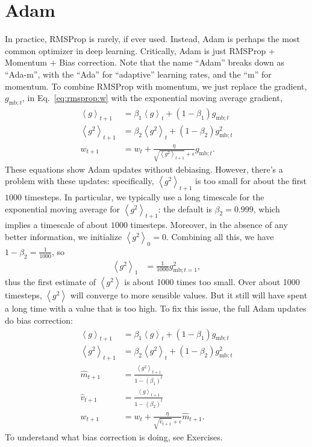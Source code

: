 \documentclass{article}
\newcommand{\bracket}[3]{\left#1 #3 \right#2}
\newcommand{\ab}{\bracket{\langle}{\rangle}}
\newcommand{\0}{\mathbf{0}}
\newcommand{\gsmbt}{g_{\text{mb}; t}}
\newcommand{\vh}{\hat{v}}
\newcommand{\mh}{\hat{m}}
\newcommand{\gssqb}{\ab{g^2}}
\newcommand{\gsb}{\ab{g}}
\begin{document}
\section{Adam}

In practice, RMSProp is rarely, if ever used.
Instead, Adam is perhaps the most common optimizer in deep learning.
Critically, Adam is just RMSProp + Momentum + Bias correction.
Note that the name ``Adam'' breaks down as ``Ada-m'', with the ``Ada'' for ``adaptive'' learning rates, and the ``m'' for momentum.
To combine RMSProp with momentum, we just replace the gradient, $\gsmbt$, in Eq.~\eqref{eq:rmsprop:w} with the exponential moving average gradient, 
\begin{align}
  \gsb_{t+1} &= \beta_1 \gsb_{t} + (1-\beta_1) \gsmbt\\
  \gssqb_{t+1} &= \beta_2 \gssqb_{t} + (1-\beta_2) \gsmbt^2\\
  w_{t+1} &= w_t + \frac{\eta}{\sqrt{\gssqb_{t+1}} + \epsilon}\gsmbt.
\end{align}
These equations show Adam updates without debiasing.
However, there's a problem with these updates: specifically, $\gssqb_{t+1}$ is too small for about the first $1000$ timesteps.
In particular, we typically use a long timescale for the exponential moving average for $\gssqb_{t+1}$: the default is $\beta_2 = 0.999$, which implies a timescale of about $1000$ timesteps.
Moreover, in the absence of any better information, we initialize $\gssqb_0 = 0$.
Combining all this, we have $1-\beta_2 = \tfrac{1}{1000}$, so
\begin{align}
  \gssqb_1 &= \tfrac{1}{1000} g_{\text{mb}; t=1}^2,
\end{align}
thus the first estimate of $\gssqb$ is about 1000 times too small.
Over about 1000 timesteps, $\gssqb$ will converge to more sensible values.
But it still will have spent a long time with a value that is too high.
To fix this issue, the full Adam updates do bias correction:
\begin{align}
  \gsb_{t+1} &= \beta_1 \gsb_{t} + (1-\beta_1) \gsmbt\\
  \gssqb_{t+1} &= \beta_2 \gssqb_{t} + (1-\beta_2) \gsmbt^2\\
  \mh_{t+1} &= \frac{\gssqb_{t+1}}{1-(\beta_1)^t}\\
  \vh_{t+1} &= \frac{\gsb_{t+1}}{1-(\beta_2)^t}\\
  w_{t+1} &= w_t + \frac{\eta}{\sqrt{\vh_{t+1}} + \epsilon}\mh_{t+1}.
\end{align}
To understand what bias correction is doing, see Exercises.
\end{document}
